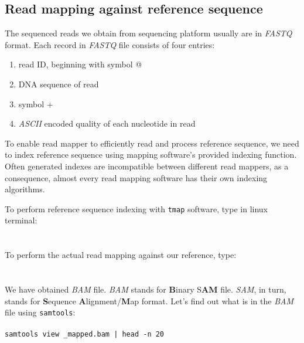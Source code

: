 \subsection{Read mapping against reference sequence}
The sequenced reads we obtain from sequencing platform usually are in \textit{FASTQ} format.
Each record in \textit{FASTQ} file consists of four entries:
\begin{enumerate}
  \item read ID, beginning with symbol @
  \item DNA sequence of read
  \item symbol +
  \item \textit{ASCII} encoded quality of each nucleotide in read
\end{enumerate}

To enable read mapper to efficiently read and process reference sequence, we need to
index reference sequence using mapping software's provided indexing function. Often generated
indexes are incompatible between different read mappers, as a consequence, almost every read
mapping software has their own indexing algorithms.

To perform reference sequence indexing with \texttt{tmap} software, type in linux terminal:\\~\\
\texttt{}\\

To perform the actual read mapping against our reference, type:\\~\\
\\

We have obtained \textit{BAM} file. \textit{BAM} stands for \textbf{B}inary S\textbf{AM} file.
\textit{SAM}, in turn, stands for \textbf{S}equence \textbf{A}lignment/\textbf{M}ap format.
Let's find out what is in the \textit{BAM} file using \texttt{samtools}:\\~\\
\texttt{samtools view \mapReads\_mapped.bam | head -n 20}\\

\\
\\
\\

